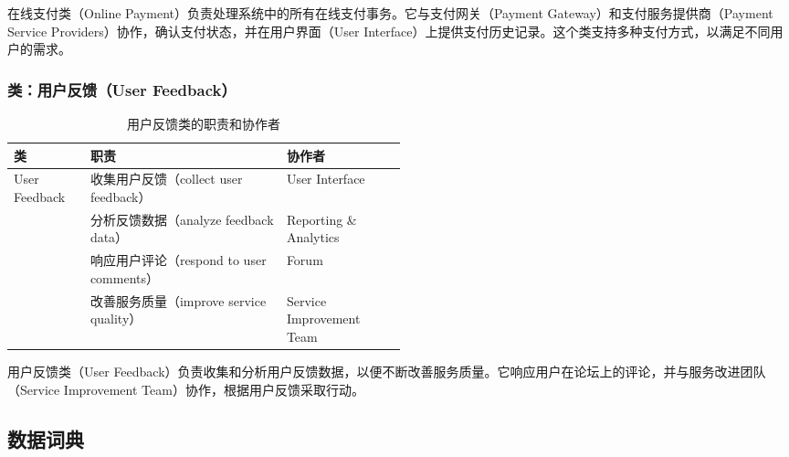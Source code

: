 在线支付类（Online Payment）负责处理系统中的所有在线支付事务。它与支付网关（Payment Gateway）和支付服务提供商（Payment Service Providers）协作，确认支付状态，并在用户界面（User Interface）上提供支付历史记录。这个类支持多种支付方式，以满足不同用户的需求。

\subsubsection{类：用户反馈（User Feedback）}
\begin{table}[htbp]
	\centering
	\begin{tabular}{|l|p{0.5\linewidth}|l|}
		\hline
		\textbf{类} & \textbf{职责} & \textbf{协作者} \\
		\hline
		User Feedback & 收集用户反馈（collect user feedback） & User Interface \\
		& 分析反馈数据（analyze feedback data） & Reporting \& Analytics \\
		& 响应用户评论（respond to user comments） & Forum \\
		& 改善服务质量（improve service quality） & Service Improvement Team \\
		\hline
	\end{tabular}
	\caption{用户反馈类的职责和协作者}
	\label{tab:user_feedback}
\end{table}

用户反馈类（User Feedback）负责收集和分析用户反馈数据，以便不断改善服务质量。它响应用户在论坛上的评论，并与服务改进团队（Service Improvement Team）协作，根据用户反馈采取行动。

\subsection{数据词典}
